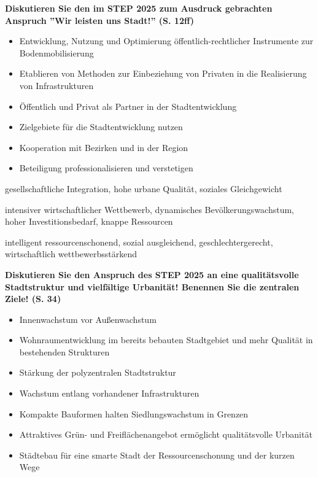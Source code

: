 \documentclass[]{article}
\newenvironment{question}{\vspace{8mm}\noindent\bfseries}{\\}
\begin{document}
\begin{question}
	Diskutieren Sie den im STEP 2025 zum Ausdruck gebrachten Anspruch ''Wir leisten uns Stadt!'' (S. 12ff)
\end{question}

\begin{itemize}
	\item Entwicklung, Nutzung und Optimierung öffentlich-rechtlicher Instrumente zur Bodenmobilisierung
	\item Etablieren von Methoden zur Einbeziehung von Privaten in die Realisierung von Infrastrukturen
	\item Öffentlich und Privat als Partner in der Stadtentwicklung
	\item Zielgebiete für die Stadtentwicklung nutzen
	\item Kooperation mit Bezirken und in der Region
	\item Beteiligung professionalisieren und verstetigen
\end{itemize}

gesellschaftliche Integration, hohe urbane Qualität, soziales Gleichgewicht

intensiver wirtschaftlicher Wettbewerb, dynamisches Bevölkerungswachstum, hoher Investitionsbedarf, knappe Ressourcen

intelligent ressourcenschonend, sozial ausgleichend, geschlechtergerecht, wirtschaftlich wettbewerbsstärkend

\begin{question}
	Diskutieren Sie den Anspruch des STEP 2025 an eine qualitätsvolle Stadtstruktur und vielfältige Urbanität! Benennen Sie die zentralen Ziele! (S. 34)
\end{question}

\begin{itemize}
	\item Innenwachstum vor Außenwachstum
	\item Wohnraumentwicklung im bereits bebauten Stadtgebiet und mehr Qualität in bestehenden Strukturen
	\item Stärkung der polyzentralen Stadtstruktur
	\item Wachstum entlang vorhandener Infrastrukturen
	\item Kompakte Bauformen halten Siedlungswachstum in Grenzen
	\item Attraktives Grün- und Freiflächenangebot ermöglicht qualitätsvolle Urbanität
	\item Städtebau für eine smarte Stadt der Ressourcenschonung und der kurzen Wege
\end{itemize}
\end{document}
